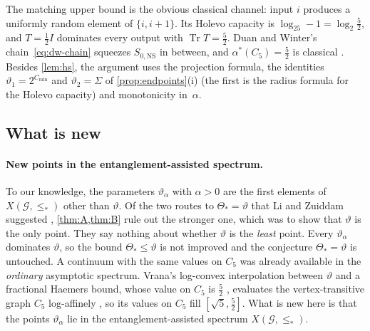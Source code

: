 \documentclass[11pt]{article}
\theoremstyle{definition}
\DeclareMathOperator{\Tr}{Tr}
\newcommand{\vt}{\vartheta}
\newcommand{\cG}{\mathcal G}
\newcommand{\Cmin}{C_{\min}}
\newcommand{\SNS}{S_{0,\mathrm{NS}}}
\newcommand{\Xs}{X(\cG,\le_*)}
\begin{document}
The matching upper bound is the obvious classical channel: input $i$ produces a
uniformly random element of $\{i,i+1\}$.  Its Holevo capacity is
$\log_25-1=\log_2\frac52$, and $T=\frac12 I$ dominates every output with
$\Tr T=\frac52$.  Duan and Winter's chain~\eqref{eq:dw-chain} squeezes $\SNS$
in between, and $\alpha^*(C_5)=\frac52$ is classical \cite{Shannon1956}.
Besides \cref{lem:hs}, the argument uses the projection formula, the
identities $\vt_1=2^{\Cmin}$ and $\vt_2=\Sigma$ of \cref{prop:endpoints}(i)
(the first is the radius formula for the Holevo capacity) and monotonicity
in~$\alpha$.

\subsection{What is new}\label{sec:new}

\paragraph{New points in the entanglement-assisted spectrum.}
To our knowledge, the parameters $\vt_\alpha$ with $\alpha>0$ are the first
elements of $\Xs$ other than $\vt$.  Of the two routes to $\Theta_*=\vt$ that
Li and Zuiddam suggested \cite{LiZuiddam2020}, \cref{thm:A,thm:B} rule out the
stronger one, which was to show that $\vt$ is the only point.  They say
nothing about whether $\vt$ is the \emph{least} point.  Every $\vt_\alpha$
dominates $\vt$, so the bound
$\Theta_*\le\vt$ is not improved and the conjecture $\Theta_*=\vt$ is
untouched.  A continuum with the same values on $C_5$ was already available
in the \emph{ordinary} asymptotic spectrum.  Vrana's log-convex interpolation
\cite{Vrana2021} between $\vt$ and a fractional Haemers bound, whose value on
$C_5$ is $\frac52$ \cite[Proposition~4]{BukhCox2019}, evaluates the
vertex-transitive graph $C_5$ log-affinely \cite[Section~5]{Vrana2022}, so
its values on $C_5$ fill $[\sqrt5,\frac52]$.  What is new here is that the
points $\vt_\alpha$ lie in the entanglement-assisted spectrum $\Xs$.
\end{document}
